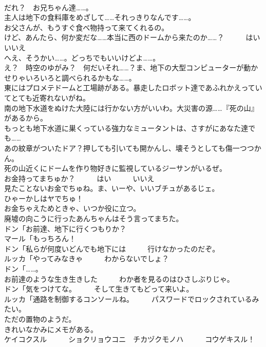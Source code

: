 \documentclass[8pt]{extreport}
\begin{document}
\begin{CJK}{UTF8}{min}
\\	だれ？　お兄ちゃん達……。	
\\	主人は地下の食料庫をめざして……それっきりなんです……。	
\\	お父さんが、もうすぐ食べ物持って来てくれるの。 
\\	けど、あんたら、何か変だな……本当に西のドームから来たのか……？　　　はい　　　いいえ	
\\	へえ、そうかい……。どっちでもいいけどよ……。	
\\	え？　時空のゆがみ？　何だいそれ……？ま、地下の大型コンピューターが動かせりゃいろいろと調べられるかもな……。	
\\	東にはプロメテドームと工場跡がある。暴走したロボット達であふれかえっていてとても近寄れないがね。	
\\	南の地下水道をぬけた大陸には行かない方がいいわ。大災害の源……『死の山』があるから。	
\\	もっとも地下水道に巣くっている強力なミュータントは、さすがにあなた達でも……	
\\	あの紋章がついたドア？押しても引いても開かんし、壊そうとしても傷一つつかん。	
\\	死の山近くにドームを作り物好きに監視しているジーサンがいるぜ。	
\\	お金持ってまちゅか？　　　はい　　　いいえ	
\\	見たことないお金でちゅね。ま、いーや、いいブチュがあるじェ。	
\\	ひゃーかしはヤでちゅ！	
\\	お金ちゃえためときゃ、いつか役に立つ。	
\\	廃墟の向こうに行ったあんちゃんはそう言ってまちた。	
\\	ドン「お前達、地下に行くつもりか？	
\\	マール「もっちろん！	
\\	ドン「私らが何度いどんでも地下には　　　行けなかったのだぞ。	
\\	ルッカ「やってみなきゃ　　　わからないでしょ？	
\\	ドン「……。	
\\	お前達のような生き生きした　　　わか者を見るのはひさしぶりじゃ。	
\\	ドン「気をつけてな。　　　そして生きてもどって来いよ。	
\\	ルッカ「通路を制御するコンソールね。　　　パスワードでロックされているみたい。	
\\	ただの置物のようだ。	
\\	きれいなかみにメモがある。	
\\	ケイコクスル　　　ショクリョウコニ　チカヅクモノハ　　　コウゲキスル！	

\end{CJK}
\end{document}
